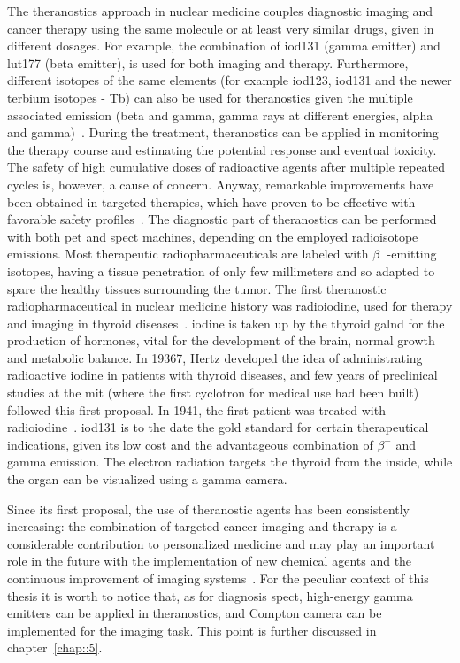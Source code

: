 The theranostics approach in nuclear medicine couples diagnostic imaging and cancer therapy using the same molecule or at least very similar drugs, given in different dosages. For example, the combination of \gls{iod131} (gamma emitter) and \gls{lut177} (beta emitter), is used for both imaging and therapy. Furthermore, different isotopes of the same elements (for example \gls{iod123}, \gls{iod131} and the newer terbium isotopes - Tb) can also be used for theranostics given the multiple associated emission (beta and gamma, gamma rays at different energies, alpha and gamma)~\parencite{Gerard2002, Alzahrani2012, Muller2012}. During the treatment, theranostics can be applied in monitoring the therapy course and estimating the potential response and eventual toxicity. The safety of high cumulative doses of radioactive agents after multiple repeated cycles is, however, a cause of concern. Anyway, remarkable improvements have been obtained in targeted therapies, which have proven to be effective with favorable safety profiles~\parencite{Baum2012, Kwekkeboom2008, Strosberg2017}. The diagnostic part of theranostics can be performed with both \gls{pet} and \gls{spect} machines, depending on the employed radioisotope emissions. Most therapeutic radiopharmaceuticals are labeled with $\beta^{-}$-emitting isotopes, having a tissue penetration of only few millimeters and so adapted to spare the healthy tissues surrounding the tumor. The first theranostic radiopharmaceutical in nuclear medicine history was radioiodine, used for therapy and imaging in thyroid diseases~\parencite{Hertz2016}. iodine is taken up by the thyroid galnd for the production of hormones, vital for the development of the brain, normal growth and metabolic balance. In 19367, Hertz developed the idea of administrating radioactive iodine in patients with thyroid diseases, and few years of preclinical studies at the \gls{mit} (where the first cyclotron for medical use had been built) followed this first proposal. In 1941, the first patient was treated with radioiodine~\parencite{Hertz1942}. \gls{iod131} is to the date the gold standard for certain therapeutical indications, given its low cost and the advantageous combination of $\beta^{-}$ and gamma emission. The electron radiation targets the thyroid from the inside, while the organ can be visualized using a gamma camera. 

Since its first proposal, the use of theranostic agents has been consistently increasing: the combination of targeted cancer imaging and therapy is a considerable contribution to personalized medicine and may play an important role in the future with the implementation of new chemical agents and the continuous improvement of imaging systems~\parencite{Yordanova2017}. For the peculiar context of this thesis it is worth to notice that, as for diagnosis \gls{spect}, high-energy gamma emitters can be applied in theranostics, and Compton camera can be implemented for the imaging task. This point is further discussed in chapter~\ref{chap::5}. 

